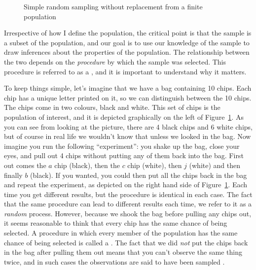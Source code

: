 
\begin{figure}[t]
\begin{center}
\end{center}
\caption{Simple random sampling without replacement from a finite population}
\label{fig:srs1}
\HR
\end{figure}

Irrespective of how I define the population, the critical point is that the sample is a subset of the population, and our goal is to use our knowledge of the sample to draw inferences about the properties of the population. The relationship between the two depends on the {\it procedure} by which the sample was selected. This procedure is referred to as a , and it is important to understand why it matters.

To keep things simple, let's imagine that we have a bag containing 10 chips. Each chip has a unique letter printed on it, so we can distinguish between the 10 chips. The chips come in two colours, black and white. This set of chips is the population of interest, and it is depicted graphically on the left of Figure~\ref{fig:srs1}. As you can see from looking at the picture, there are 4 black chips and 6 white chips, but of course in real life we wouldn't know that unless we looked in the bag. Now imagine you run the following ``experiment'': you shake up the bag, close your eyes, and pull out 4 chips without putting any of them back into the bag. First out comes the $a$ chip (black), then the $c$ chip (white), then $j$ (white) and then finally $b$ (black). If you wanted, you could then put all the chips back in the bag and repeat the experiment, as depicted on the right hand side of Figure~\ref{fig:srs1}. Each time you get different results, but the procedure is identical in each case. The fact that the same procedure can lead to different results each time, we refer to it as a {\it random} process. However, because we shook the bag before pulling any chips out, it seems reasonable to think that every chip has the same chance of being selected. A procedure in which every member of the population has the same chance of being selected is called a . The fact that we did {\it not} put the chips back in the bag after pulling them out means that you can't observe the same thing twice, and in such cases the observations are said to have been sampled . 

